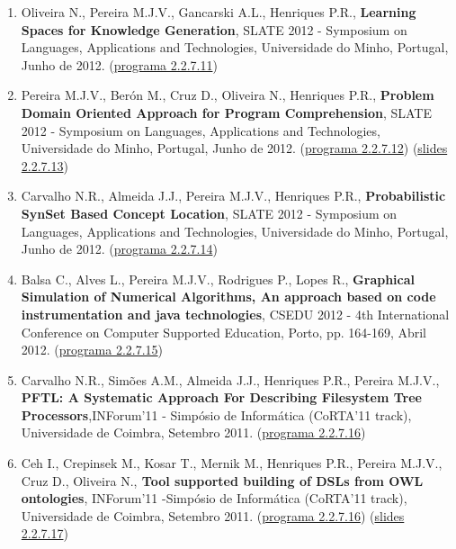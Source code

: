 \documentclass[11pt]{article}
\begin{document}
\begin{enumerate}
\item {Oliveira N., Pereira M.J.V., Gancarski A.L., Henriques P.R., {\bf{ Learning Spaces for Knowledge Generation}}, SLATE 2012 - Symposium on Languages, Applications and Technologies, Universidade do Minho, Portugal, Junho de 2012. (\href{run:ComunicacoesOrais/programas/SLATE2012prog.pdf}{programa 2.2.7.11})}

\item {Pereira M.J.V., Berón M., Cruz D., Oliveira N., Henriques P.R., {\bf{ Problem Domain Oriented Approach for Program Comprehension}}, SLATE 2012 - Symposium on Languages, Applications and Technologies, Universidade do Minho, Portugal, Junho de 2012. (\href{run:ComunicacoesOrais/programas/SLATE2012prog2.pdf}{programa 2.2.7.12}) (\href{run:ComunicacoesOrais/Slate12apres.pdf}{slides 2.2.7.13})}

\item {Carvalho N.R., Almeida J.J., Pereira M.J.V., Henriques P.R., {\bf{ Probabilistic SynSet Based Concept Location}}, SLATE 2012 - Symposium on Languages, Applications and Technologies, Universidade do Minho, Portugal, Junho de 2012. (\href{run:ComunicacoesOrais/programas/SLATE2012prog2.pdf}{programa 2.2.7.14})}

\item {Balsa C., Alves L., Pereira M.J.V., Rodrigues P., Lopes R., {\bf{ Graphical Simulation of Numerical Algorithms, An approach based on code instrumentation and java technologies}}, CSEDU 2012 - 4th International Conference on Computer Supported Education, Porto, pp. 164-169, Abril 2012. (\href{run:ComunicacoesOrais/programas/CSEDU2012prog.pdf}{programa 2.2.7.15})}

\item {Carvalho N.R., Simões A.M., Almeida J.J., Henriques P.R., Pereira M.J.V., {\bf{ PFTL: A Systematic Approach For Describing Filesystem Tree Processors}},INForum'11 - Simpósio de Informática (CoRTA'11 track), Universidade de Coimbra, Setembro 2011. (\href{run:ComunicacoesOrais/programas/INForum2011prog.pdf}{programa 2.2.7.16})}

\item {Ceh I., Crepinsek M., Kosar T., Mernik M., Henriques P.R., Pereira M.J.V., Cruz D., Oliveira N.,{\bf{ Tool supported building of {DSL}}s from {OWL} ontologies}, INForum'11 -Simpósio de Informática (CoRTA'11 track), Universidade de Coimbra, Setembro 2011. (\href{run:ComunicacoesOrais/programas/INForum2011prog.pdf}{programa 2.2.7.16}) (\href{run:ComunicacoesOrais/Corta11apres.pdf}{slides 2.2.7.17})}


\end{enumerate}
\end{document}
